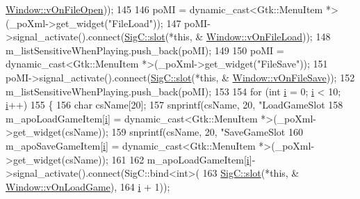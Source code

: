 \begin{DoxyCode}
      \mbox{\hyperlink{class_v_b_a_1_1_window_a8495a133642f2f0428d9487c86c8a231}{Window::vOnFileOpen}}));
145 
146   poMI = \textcolor{keyword}{dynamic\_cast<}Gtk::MenuItem *\textcolor{keyword}{>}(\_poXml->get\_widget(\textcolor{stringliteral}{"FileLoad"}));
147   poMI->signal\_activate().connect(\mbox{\hyperlink{namespace_sig_c_a92e4f19202b77e78ac1db05f5a62f6b6}{SigC::slot}}(*\textcolor{keyword}{this}, &
      \mbox{\hyperlink{class_v_b_a_1_1_window_a74bd51bc1e0e699d5523ad7828031394}{Window::vOnFileLoad}}));
148   m\_listSensitiveWhenPlaying.push\_back(poMI);
149 
150   poMI = \textcolor{keyword}{dynamic\_cast<}Gtk::MenuItem *\textcolor{keyword}{>}(\_poXml->get\_widget(\textcolor{stringliteral}{"FileSave"}));
151   poMI->signal\_activate().connect(\mbox{\hyperlink{namespace_sig_c_a92e4f19202b77e78ac1db05f5a62f6b6}{SigC::slot}}(*\textcolor{keyword}{this}, &
      \mbox{\hyperlink{class_v_b_a_1_1_window_a27bb0ed15cc90758c95eb11fddd14a86}{Window::vOnFileSave}}));
152   m\_listSensitiveWhenPlaying.push\_back(poMI);
153 
154   \textcolor{keywordflow}{for} (\textcolor{keywordtype}{int} \mbox{\hyperlink{expr-lex_8cpp_acb559820d9ca11295b4500f179ef6392}{i}} = 0; \mbox{\hyperlink{expr-lex_8cpp_acb559820d9ca11295b4500f179ef6392}{i}} < 10; \mbox{\hyperlink{expr-lex_8cpp_acb559820d9ca11295b4500f179ef6392}{i}}++)
155   \{
156     \textcolor{keywordtype}{char} csName[20];
157     snprintf(csName, 20, \textcolor{stringliteral}{"LoadGameSlot%
158     m\_apoLoadGameItem[\mbox{\hyperlink{expr-lex_8cpp_acb559820d9ca11295b4500f179ef6392}{i}}] = \textcolor{keyword}{dynamic\_cast<}Gtk::MenuItem *\textcolor{keyword}{>}(\_poXml->get\_widget(csName));
159     snprintf(csName, 20, \textcolor{stringliteral}{"SaveGameSlot%
160     m\_apoSaveGameItem[\mbox{\hyperlink{expr-lex_8cpp_acb559820d9ca11295b4500f179ef6392}{i}}] = \textcolor{keyword}{dynamic\_cast<}Gtk::MenuItem *\textcolor{keyword}{>}(\_poXml->get\_widget(csName));
161 
162     m\_apoLoadGameItem[\mbox{\hyperlink{expr-lex_8cpp_acb559820d9ca11295b4500f179ef6392}{i}}]->signal\_activate().connect(SigC::bind<int>(
163                                                       \mbox{\hyperlink{namespace_sig_c_a92e4f19202b77e78ac1db05f5a62f6b6}{SigC::slot}}(*\textcolor{keyword}{this}, &
      \mbox{\hyperlink{class_v_b_a_1_1_window_a18461a94955930d3e10fdb093322d7a9}{Window::vOnLoadGame}}),
164                                                       \mbox{\hyperlink{expr-lex_8cpp_acb559820d9ca11295b4500f179ef6392}{i}} + 1));
}}
\end{DoxyCode}
